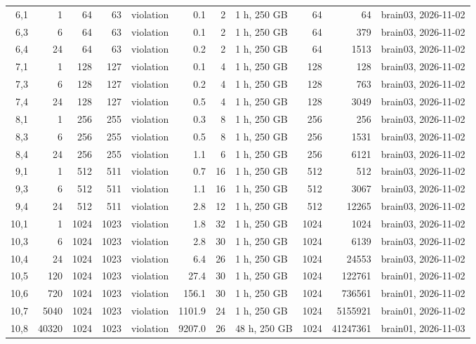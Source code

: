 \documentclass[10pt]{article}
\begin{document}
\begin{longtable}{@{}rrrrlrrlrrl@{}}
\color{blue} 6,1 & 1 & 64 & 63 & violation & 0.1 & 2 & 1 h, 250 GB & 64 & 64 & brain03, 2026-11-02 \\
\color{blue} 6,3 & 6 & 64 & 63 & violation & 0.1 & 2 & 1 h, 250 GB & 64 & 379 & brain03, 2026-11-02 \\
\color{blue} 6,4 & 24 & 64 & 63 & violation & 0.2 & 2 & 1 h, 250 GB & 64 & 1513 & brain03, 2026-11-02 \\
\color{blue} 7,1 & 1 & 128 & 127 & violation & 0.1 & 4 & 1 h, 250 GB & 128 & 128 & brain03, 2026-11-02 \\
\color{blue} 7,3 & 6 & 128 & 127 & violation & 0.2 & 4 & 1 h, 250 GB & 128 & 763 & brain03, 2026-11-02 \\
\color{blue} 7,4 & 24 & 128 & 127 & violation & 0.5 & 4 & 1 h, 250 GB & 128 & 3049 & brain03, 2026-11-02 \\
\color{blue} 8,1 & 1 & 256 & 255 & violation & 0.3 & 8 & 1 h, 250 GB & 256 & 256 & brain03, 2026-11-02 \\
\color{blue} 8,3 & 6 & 256 & 255 & violation & 0.5 & 8 & 1 h, 250 GB & 256 & 1531 & brain03, 2026-11-02 \\
\color{blue} 8,4 & 24 & 256 & 255 & violation & 1.1 & 6 & 1 h, 250 GB & 256 & 6121 & brain03, 2026-11-02 \\
\color{blue} 9,1 & 1 & 512 & 511 & violation & 0.7 & 16 & 1 h, 250 GB & 512 & 512 & brain03, 2026-11-02 \\
\color{blue} 9,3 & 6 & 512 & 511 & violation & 1.1 & 16 & 1 h, 250 GB & 512 & 3067 & brain03, 2026-11-02 \\
\color{blue} 9,4 & 24 & 512 & 511 & violation & 2.8 & 12 & 1 h, 250 GB & 512 & 12265 & brain03, 2026-11-02 \\
\color{blue} 10,1 & 1 & 1024 & 1023 & violation & 1.8 & 32 & 1 h, 250 GB & 1024 & 1024 & brain03, 2026-11-02 \\
\color{blue} 10,3 & 6 & 1024 & 1023 & violation & 2.8 & 30 & 1 h, 250 GB & 1024 & 6139 & brain03, 2026-11-02 \\
\color{blue} 10,4 & 24 & 1024 & 1023 & violation & 6.4 & 26 & 1 h, 250 GB & 1024 & 24553 & brain03, 2026-11-02 \\
\color{blue} 10,5 & 120 & 1024 & 1023 & violation & 27.4 & 30 & 1 h, 250 GB & 1024 & 122761 & brain01, 2026-11-02 \\
\color{blue} 10,6 & 720 & 1024 & 1023 & violation & 156.1 & 30 & 1 h, 250 GB & 1024 & 736561 & brain01, 2026-11-02 \\
\color{blue} 10,7 & 5040 & 1024 & 1023 & violation & 1101.9 & 24 & 1 h, 250 GB & 1024 & 5155921 & brain01, 2026-11-02 \\
\color{blue} 10,8 & 40320 & 1024 & 1023 & violation & 9207.0 & 26 & 48 h, 250 GB & 1024 & 41247361 & brain01, 2026-11-03 \\
\bottomrule
\end{longtable}
\end{document}
